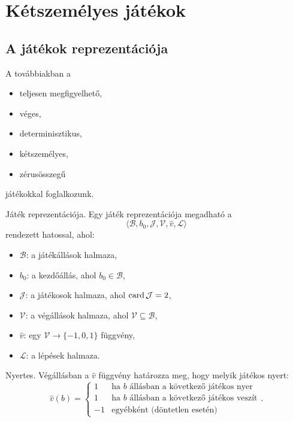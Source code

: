\section{Kétszemélyes játékok}

\subsection{A játékok reprezentációja}

A továbbiakban a
\begin{itemize}
    \item teljesen megfigyelhető,
    \item véges,
    \item determinisztikus,
    \item kétszemélyes,
    \item zérusösszegű
\end{itemize}
játékokkal foglalkozunk.

\begin{definicio}
    Játék reprezentációja.
    Egy játék reprezentációja megadható a
    \[
        \langle
        \mathcal{B},
        b_0,
        \mathcal{J},
        \mathcal{V},
        \hat{v},
        \mathcal{L}
        \rangle
    \]
    rendezett hatossal, ahol:
    \begin{itemize}
        \item $\mathcal{B}$: a játékállások halmaza,
        \item $b_0$: a kezdőállás, ahol $b_0 \in \mathcal{B}$,
        \item $\mathcal{J}$: a játékosok halmaza, ahol $\operatorname{card} \mathcal{J} = 2$,
        \item $\mathcal{V}$: a végállások halmaza, ahol $\mathcal{V} \subseteq
            \mathcal{B}$,
        \item $\hat{v}$: egy $\mathcal{V} \to \{-1, 0, 1\} $
            függvény,
        \item $\mathcal{L}$: a lépések halmaza.
    \end{itemize}
\end{definicio}

\begin{definicio}
    Nyertes.
    Végállásban a $\hat{v}$ függvény határozza meg, hogy melyik
    játékos nyert:
     \[
        \hat{v}(b) =
        \begin{cases}
            1 & \text{ha $b$ állásban a következő játékos nyer} \\
            1 & \text{ha $b$ állásban a következő játékos veszít} \\
            -1 & \text{egyébként (döntetlen esetén)}
        \end{cases}
    .\]
\end{definicio}


